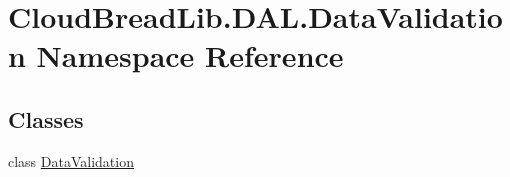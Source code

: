 \hypertarget{a00434}{}\section{Cloud\+Bread\+Lib.\+D\+A\+L.\+Data\+Validation Namespace Reference}
\label{a00434}
\subsection*{Classes}
\begin{DoxyCompactItemize}
\item 
class \hyperlink{a00073}{Data\+Validation}
\end{DoxyCompactItemize}
